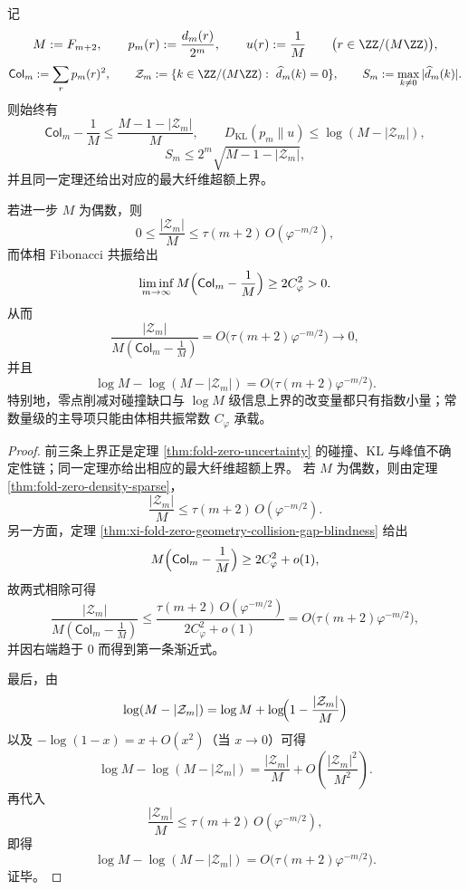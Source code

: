\begin{theorem}\label{thm:conclusion-zero-reduction-second-order-collision-kl}
记
\[
M:=F_{m+2},
\qquad
p_m(r):=\frac{d_m(r)}{2^m},
\qquad
u(r):=\frac{1}{M}
\qquad
\bigl(r\in \ZZ/(M\ZZ)\bigr),
\]
\[
\mathsf{Col}_m:=\sum_{r}p_m(r)^2,
\qquad
\mathcal Z_m:=\{k\in \ZZ/(M\ZZ):\ \widehat d_m(k)=0\},
\qquad
S_m:=\max_{k\neq 0}|\widehat d_m(k)|.
\]
则始终有
\[
\mathsf{Col}_m-\frac1M
\le
\frac{M-1-|\mathcal Z_m|}{M},
\qquad
D_{\mathrm{KL}}(p_m\|u)\le \log(M-|\mathcal Z_m|),
\]
\[
S_m\le 2^m\sqrt{M-1-|\mathcal Z_m|},
\]
并且同一定理还给出对应的最大纤维超额上界。

若进一步 \(M\) 为偶数，则
\[
0\le \frac{|\mathcal Z_m|}{M}\le \tau(m+2)\,O(\varphi^{-m/2}),
\]
而体相 Fibonacci 共振给出
\[
\liminf_{m\to\infty}M\Bigl(\mathsf{Col}_m-\frac1M\Bigr)\ge 2C_\varphi^2>0.
\]
从而
\[
\frac{|\mathcal Z_m|}{M\left(\mathsf{Col}_m-\frac1M\right)}
=
O\!\bigl(\tau(m+2)\varphi^{-m/2}\bigr)
\longrightarrow 0,
\]
并且
\[
\log M-\log(M-|\mathcal Z_m|)
=
O\!\bigl(\tau(m+2)\varphi^{-m/2}\bigr).
\]
特别地，零点削减对碰撞缺口与 \(\log M\) 级信息上界的改变量都只有指数小量；常数量级的主导项只能由体相共振常数 \(C_\varphi\) 承载。
\end{theorem}
\begin{proof}
前三条上界正是定理 \ref{thm:fold-zero-uncertainty} 的碰撞、KL 与峰值不确定性链；同一定理亦给出相应的最大纤维超额上界。
若 \(M\) 为偶数，则由定理 \ref{thm:fold-zero-density-sparse}，
\[
\frac{|\mathcal Z_m|}{M}\le \tau(m+2)\,O(\varphi^{-m/2}).
\]
另一方面，定理 \ref{thm:xi-fold-zero-geometry-collision-gap-blindness} 给出
\[
M\Bigl(\mathsf{Col}_m-\frac1M\Bigr)\ge 2C_\varphi^2+o(1),
\]
故两式相除可得
\[
\frac{|\mathcal Z_m|}{M\left(\mathsf{Col}_m-\frac1M\right)}
\le
\frac{\tau(m+2)\,O(\varphi^{-m/2})}{2C_\varphi^2+o(1)}
=
O\!\bigl(\tau(m+2)\varphi^{-m/2}\bigr),
\]
并因右端趋于 \(0\) 而得到第一条渐近式。

最后，由
\[
\log(M-|\mathcal Z_m|)
=
\log M+\log\!\Bigl(1-\frac{|\mathcal Z_m|}{M}\Bigr)
\]
以及 \(-\log(1-x)=x+O(x^2)\)（当 \(x\to 0\)）可得
\[
\log M-\log(M-|\mathcal Z_m|)
=
\frac{|\mathcal Z_m|}{M}
+O\!\left(\frac{|\mathcal Z_m|^2}{M^2}\right).
\]
再代入
\[
\frac{|\mathcal Z_m|}{M}\le \tau(m+2)\,O(\varphi^{-m/2}),
\]
即得
\[
\log M-\log(M-|\mathcal Z_m|)
=
O\!\bigl(\tau(m+2)\varphi^{-m/2}\bigr).
\]
证毕。
\end{proof}

